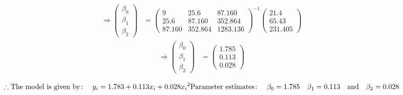 \documentclass[
]{article}
\begin{document}
\begin{align*}
  \Rightarrow
    \begin{pmatrix}
      \beta_0\\
      \beta_1 \\
      \beta_2
    \end{pmatrix}
    & =
    \begin{pmatrix}
     9 &  25.6 &  87.160 \\
     25.6 & 87.160 & 352.864 \\
     87.160 & 352.864 & 1283.136
  \end{pmatrix}^{-1}
  
  \begin{pmatrix}
    21.4\\
    65.43 \\
    231.405
  \end{pmatrix}
\end{align*} \begin{align*}
  \Rightarrow
    \begin{pmatrix}
      \beta_0\\
      \beta_1 \\
      \beta_2
    \end{pmatrix}
    & = 
    \begin{pmatrix}
    1.785\\
    0.113 \\
    0.028
  \end{pmatrix}
\end{align*}

\[
\therefore \text{The model is given by} \colon \quad  y_i = 1.783 + 0.113x_i + 0.028{x_i}^2\\
\text{Parameter estimates} \colon \quad \beta_0 = 1.785 \quad  \beta_1 = 0.113 \quad \text{and} \quad \beta_2 = 0.028
\]
\end{document}
